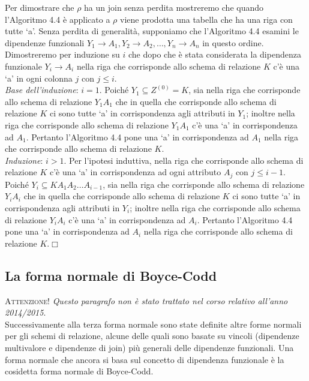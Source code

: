 Per dimostrare che $\rho$ ha un join senza perdita mostreremo che quando l'Algoritmo 4.4 è applicato a $\rho$
viene prodotta una tabella che ha una riga con tutte `a'. Senza perdita di generalità, supponiamo che l'Algoritmo 4.4
esamini le dipendenze funzionali $Y_1 \rightarrow A_1, Y_2 \rightarrow A_2, \ldots, Y_n \rightarrow A_n$ in questo ordine.
Dimostreremo per induzione su $i$ che dopo che è stata considerata la dipendenza funzionale $Y_i \rightarrow A_i$ nella 
riga che corrisponde allo schema di relazione $K$ c'è una `a' in ogni colonna $j$ con $j \leq i$.\\
\emph{Base dell'induzione}: $i=1$. Poiché $Y_1 \subseteq Z^{(0)} = K$, sia nella riga che corrisponde allo schema di
relazione $Y_1A_1$ che in quella che corrisponde allo schema di relazione $K$ ci sono tutte `a' in corrispondenza
agli attributi in $Y_1$; inoltre nella riga che corrisponde allo schema di relazione $Y_1A_1$ c'è una `a' in
corrispondenza ad $A_1$. Pertanto l'Algoritmo 4.4 pone una `a' in corrispondenza ad $A_1$ nella riga che corrisponde 
allo schema di relazione $K$.\\ 
\emph{Induzione}: $i > 1$. Per l'ipotesi induttiva, nella riga che corrisponde allo schema di relazione $K$ c'è una
`a' in corrispondenza ad ogni attributo $A_j$ con $j \leq i-1$. Poiché $Y_i \subseteq KA_1A_2\ldots A_{i-1}$, sia nella
riga che corrisponde allo schema di relazione $Y_iA_i$ che in quella che corrisponde allo schema di relazione $K$ ci sono
tutte `a' in corrispondenza agli attributi in $Y_i$; inoltre nella riga che corrisponde allo schema di relazione $Y_iA_i$
c'è una `a' in corrispondenza ad $A_i$. Pertanto l'Algoritmo 4.4 pone una `a' in corrispondenza ad $A_i$ nella riga che 
corrisponde allo schema di relazione $K$.\hfill $\Box$
\subsection{La forma normale di Boyce-Codd}
\textsc{Attenzione!} \emph{Questo paragrafo non è stato trattato nel corso relativo all'anno 2014/2015}.\\

\noindent Successivamente alla terza forma normale sono state definite altre forme normali per gli schemi di relazione, alcune delle 
quali sono basate su vincoli (dipendenze multivalore e dipendenze di join) più generali delle dipendenze funzionali. Una 
forma normale che ancora si basa sul concetto di dipendenza funzionale è la cosidetta forma normale di Boyce-Codd.

